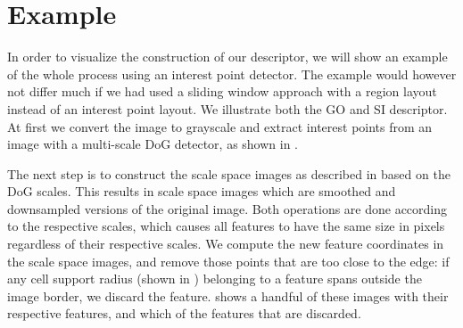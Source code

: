\documentclass[thesis.tex]{subfiles}
\begin{document}
\section{Example} \label{sec:proposedDescriptorExample}
%
In order to visualize the construction of our descriptor, we will show an example of the whole process using an interest point detector. The example would however not differ much if we had used a sliding window approach with a region layout instead of an interest point layout. We illustrate both the GO and SI descriptor. At first we convert the image to grayscale and extract interest points from an image with a multi-scale DoG detector, as shown in .

The next step is to construct the scale space images as described in  based on the DoG scales. This results in scale space images which are smoothed and downsampled versions of the original image. Both operations are done according to the respective scales, which causes all features to have the same size in pixels regardless of their respective scales. We compute the new feature coordinates in the scale space images, and remove those points that are too close to the edge: if any cell support radius (shown in ) belonging to a feature spans outside the image border, we discard the feature.  shows a handful of these images with their respective features, and which of the features that are discarded.
\end{document}
